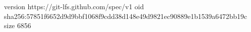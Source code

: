 version https://git-lfs.github.com/spec/v1
oid sha256:57851f6652d9d9bbf1068f9cdd38d148e49d9821ec90889e1b1539a6472bb19c
size 6856
